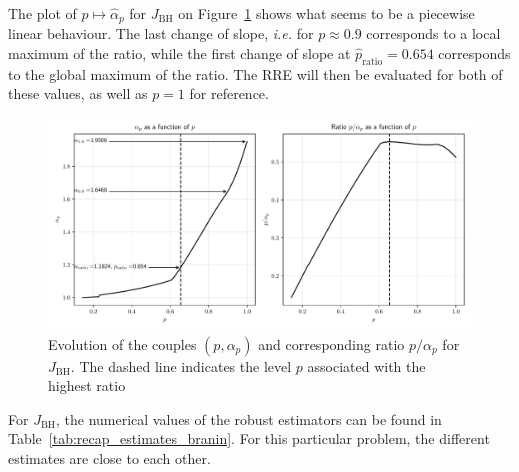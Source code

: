 \documentclass[preprint, 1p]{elsarticle}
\newcommand{\RRE}{RRE}
\newcommand{\checkap}{{\alpha}_p}
\newcommand{\checka}{{\alpha}}
\newcommand{\JBH}{J_{\mathrm{BH}}}
\newlength{\onehalfcolumn}
\begin{document}
 The plot of $p\mapsto \hat{\checka}_p$ for $\JBH$ on Figure~\ref{fig:ratio_BH} shows what seems to be a piecewise linear behaviour. The last change of slope, \textit{i.e.} for $p\approx 0.9$ corresponds to a local maximum of the ratio, while the first change of slope at $\hat{p}_{\mathrm{ratio}}=0.654$ corresponds to the global maximum of the ratio. The \RRE{} will then be evaluated for both of these values, as well as $p=1$ for reference.
 
 \begin{figure}[!ht]
   \centering
\includegraphics[width=\onehalfcolumn]{Figures/FIG06.pdf}
\caption{Evolution of the couples $(p,\checkap)$ and corresponding ratio $p/\checkap$ for $\JBH$. The dashed line indicates the level $p$ associated with the highest ratio}
\label{fig:ratio_BH}
\end{figure}


 For $\JBH$, the numerical values of the robust estimators can be found in Table~\ref{tab:recap_estimates_branin}. For this particular problem, the different estimates are close to each other.
 
\end{document}
